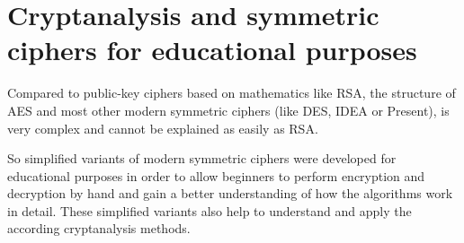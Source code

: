\section[Cryptanalysis and symmetric ciphers for educational purposes]{Cryptanalysis and symmetric ciphers for educational purposes\footnotemark}

Compared to public-key ciphers based on mathematics like RSA, the structure of AES and most other modern symmetric ciphers (like DES, IDEA or Present), is very complex and cannot be explained as easily as RSA.

So simplified variants of modern symmetric ciphers were developed for
educational purposes in order to allow beginners to perform
encryption and decryption by hand and gain a better understanding of how the
algorithms work in detail.
These simplified variants also help to understand and apply the according
cryptanalysis methods.

